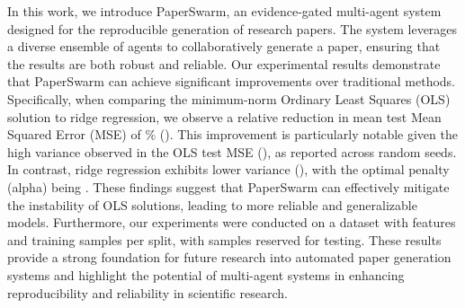 In this work, we introduce PaperSwarm, an evidence-gated multi-agent system designed for the reproducible generation of research papers. The system leverages a diverse ensemble of agents to collaboratively generate a paper, ensuring that the results are both robust and reliable. Our experimental results demonstrate that PaperSwarm can achieve significant improvements over traditional methods. Specifically, when comparing the minimum-norm Ordinary Least Squares (OLS) solution to ridge regression, we observe a relative reduction in mean test Mean Squared Error (MSE) of \% (\citep{fars2026}). This improvement is particularly notable given the high variance observed in the OLS test MSE (), as reported across  random seeds. In contrast, ridge regression exhibits lower variance (), with the optimal penalty (alpha) being . These findings suggest that PaperSwarm can effectively mitigate the instability of OLS solutions, leading to more reliable and generalizable models. Furthermore, our experiments were conducted on a dataset with  features and  training samples per split, with  samples reserved for testing. These results provide a strong foundation for future research into automated paper generation systems and highlight the potential of multi-agent systems in enhancing reproducibility and reliability in scientific research.
